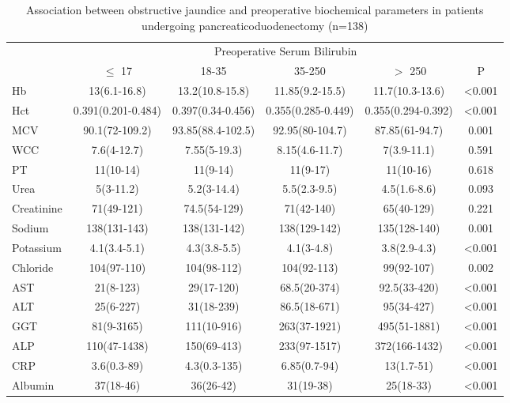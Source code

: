 	\begin{sidewaystable}[htbp]
		\caption{Association between obstructive jaundice and preoperative biochemical parameters in patients undergoing pancreaticoduodenectomy (n=138)}
		\label{table:cpet_oj_table2}
		\centering
		\renewcommand{\arraystretch}{1.4} %
		\setlength{\tabcolsep}{9pt} %
		
		\begin{tabular}{l c c c c c}
			\hline
			           &                     \multicolumn{5}{c}{Preoperative Serum Bilirubin}                      \\
			           & $\leq$ 17          & 18-35             & 35-250             & $>$ 250            & P      \\ \hline
			Hb         & 13(6.1-16.8)       & 13.2(10.8-15.8)   & 11.85(9.2-15.5)    & 11.7(10.3-13.6)    & <0.001 \\
			Hct        & 0.391(0.201-0.484) & 0.397(0.34-0.456) & 0.355(0.285-0.449) & 0.355(0.294-0.392) & <0.001 \\
			MCV        & 90.1(72-109.2)     & 93.85(88.4-102.5) & 92.95(80-104.7)    & 87.85(61-94.7)     & 0.001  \\
			WCC        & 7.6(4-12.7)        & 7.55(5-19.3)      & 8.15(4.6-11.7)     & 7(3.9-11.1)        & 0.591  \\
			PT         & 11(10-14)          & 11(9-14)          & 11(9-17)           & 11(10-16)          & 0.618  \\
			Urea       & 5(3-11.2)          & 5.2(3-14.4)       & 5.5(2.3-9.5)       & 4.5(1.6-8.6)       & 0.093  \\
			Creatinine & 71(49-121)         & 74.5(54-129)      & 71(42-140)         & 65(40-129)         & 0.221  \\
			Sodium     & 138(131-143)       & 138(131-142)      & 138(129-142)       & 135(128-140)       & 0.001  \\
			Potassium  & 4.1(3.4-5.1)       & 4.3(3.8-5.5)      & 4.1(3-4.8)         & 3.8(2.9-4.3)       & <0.001 \\
			Chloride   & 104(97-110)        & 104(98-112)       & 104(92-113)        & 99(92-107)         & 0.002  \\
			AST        & 21(8-123)          & 29(17-120)        & 68.5(20-374)       & 92.5(33-420)       & <0.001 \\
			ALT        & 25(6-227)          & 31(18-239)        & 86.5(18-671)       & 95(34-427)         & <0.001 \\
			GGT        & 81(9-3165)         & 111(10-916)       & 263(37-1921)       & 495(51-1881)       & <0.001 \\
			ALP        & 110(47-1438)       & 150(69-413)       & 233(97-1517)       & 372(166-1432)      & <0.001 \\
			CRP        & 3.6(0.3-89)        & 4.3(0.3-135)      & 6.85(0.7-94)       & 13(1.7-51)         & <0.001 \\
			Albumin    & 37(18-46)          & 36(26-42)         & 31(19-38)          & 25(18-33)          & <0.001 \\ \hline
		\end{tabular}
	\end{sidewaystable}